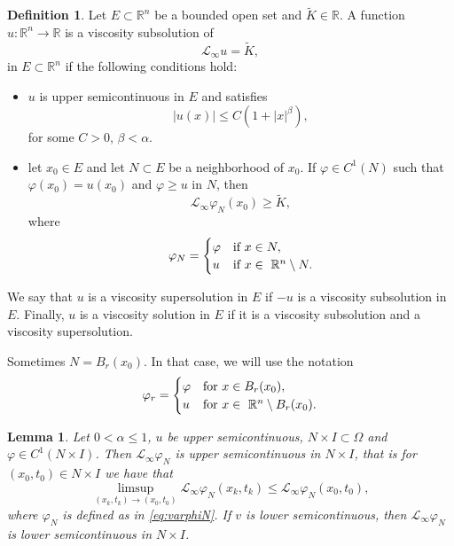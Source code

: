 \documentclass[11pt]{article}
\newcommand{\R}{\mathbb{R}}
\providecommand{\Linf}{\mathcal{L}_{\infty}}
\providecommand{\Rn}{\mathbb{R}^n}
\providecommand{\Ns}{N \times I}
\newtheorem{lem}[thm]{Lemma}
\numberwithin{equation}{section}
\theoremstyle{definition}
\newtheorem{definition}[thm]{Definition}
\begin{document}
\begin{definition}\label{def:viscsolspace}
    Let $E \subset \Rn$ be a bounded open set and $\tilde{K} \in \R$. A function  $u: \Rn \to \R$ is a viscosity subsolution of 
    \begin{equation}\label{eq:usubKspace}
        \Linf u = \tilde{K},
    \end{equation}
    in $E \subset \Rn$ if the following conditions hold:
    \begin{itemize}
        \item $u$ is upper semicontinuous in $E$ and satisfies
         \begin{equation}\label{eq:growthcond2}
             |u(x)| \leq C(1+|x|^{\beta}), 
         \end{equation} 
         for some $C> 0$, $\beta < \alpha$. 
        \item let $x_0 \in E$ and let $N  \subset E$ be a neighborhood of $x_0$. If $\varphi \in C^1(N)$ such that $\varphi(x_0)=u(x_0)$ and $\varphi \geq u$ in $N$, then
    $$
    \mathcal{L}_{\infty}\varphi_N(x_0) \geq \tilde{K}, 
    $$
    where
\begin{align*}
     \varphi_N= \begin{cases}
                      \varphi & \textup{if  } x \in N,\\
                      u & \textup{if  } x \in \ \Rn   \setminus N.
            \end{cases}
 \end{align*} 
\end{itemize}
We say that $u$ is a viscosity supersolution in $E$ if $-u$ is a viscosity subsolution in $E$. Finally, $u$ is a viscosity solution in $E$ if it is a viscosity subsolution and a viscosity supersolution.
\end{definition}


Sometimes $N= B_r(x_0)$. In that case, we will use the notation
\begin{align}\label{eq:defvarphirspace}
     \varphi_r= \begin{cases}
                      \varphi & \textup{for  }  x \in B_r(x_0),\\
                      u & \textup{for  } x \in \ \Rn   \setminus  B_r(x_0).
            \end{cases}
 \end{align}
\begin{lem}\label{lem:Linfusc}
    Let $0<\alpha \leq 1$, $u$ be upper semicontinuous, $\Ns \subset \Omega$ and $\varphi \in C^1(\Ns)$. Then $\Linf \varphi_{N}$ is upper semicontinuous in $\Ns$, that is for $(x_0,t_0) \in \Ns$ we have that
    \begin{equation*}
        \limsup_{(x_k,t_k) \to (x_0,t_0)} \Linf \varphi_{N}(x_k,t_k) \leq \Linf \varphi_{N}(x_0,t_0),
    \end{equation*}
    where $\varphi_{N}$ is defined as in \eqref{eq:varphiN}. If $v$ is lower semicontinuous, then $\Linf \varphi_{N}$ is lower semicontinuous in $\Ns$.
\end{lem}
\end{document}
